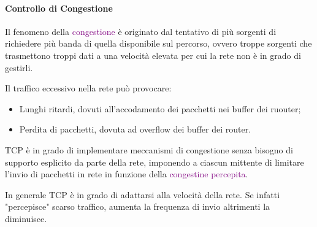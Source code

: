 \paragraph{Controllo di Congestione}

Il fenomeno della \textcolor{purple}{congestione} è originato dal tentativo di più sorgenti di richiedere più banda di quella disponibile sul percorso, ovvero troppe sorgenti che trasmettono troppi dati a una velocità elevata per cui la rete non è in grado di gestirli.

Il traffico eccessivo nella rete può provocare:
\begin{itemize}
    \item Lunghi ritardi, dovuti all'accodamento dei pacchetti nei buffer dei ruouter;
    \item Perdita di pacchetti, dovuta ad overflow dei buffer dei router.
\end{itemize}

TCP è in grado di implementare meccanismi di congestione senza bisogno di supporto esplicito da parte della rete, imponendo a ciascun mittente di limitare l'invio di pacchetti in rete in funzione della \textcolor{purple}{congestine percepita}. 

In generale TCP è in grado di adattarsi alla velocità della rete. 
Se infatti "percepisce" scarso traffico, aumenta la frequenza di invio altrimenti la diminuisce.


